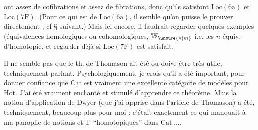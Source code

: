 ont assez de cofibrations et assez de fibrations,
donc qu'ils satisfont $\mathrm{Loc}(6\mathrm{a})$ et $\mathrm{Loc}(7\mathrm{F})$.
(Pour ce qui est de $\mathrm{Loc}(6\mathrm{a})$, il semble qu'on
puisse le prouver directement , cf \S{} suivant.)
Mais ici encore, il faudrait regarder quelques
exemples (équivalences homologiques ou cohomologiques,
$\mathbb{W}_{\unsure{n|m}}$ i.e. les $n$-équiv. d'homotopie.
et regarder déjà si $\mathrm{Loc}(7\mathrm{F})$ est satisfait.

Il ne  semble pas que le th. de
Thomason ait été  ou doive être très utile,
 techniquement parlant. Psychologiquement,
je crois qu'il a été important,
pour donner confiance que $\mathrm{Cat}$ est vraiment
une excellente catégorie de modèles
pour $\mathrm{Hot}$. J'ai été vraiment enchanté et
stimulé d'apprendre ce théorème. Mais
la notion d'application de Dwyer (que j'ai
apprise  dans l'article de Thomason) a
été, techniquement, beaucoup plus 
pour moi : c'était exactement ce qui
manquait à ma panoplie de notions et d'
``homotopiques'' dans $\mathrm{Cat}$ ....
